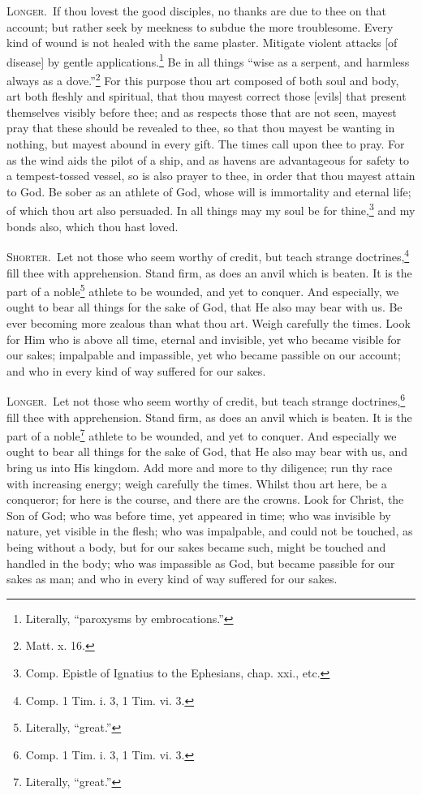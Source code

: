 \textsc{Longer.}~If thou lovest the good disciples, no thanks are due to thee on that account; but rather seek by meekness to subdue the more troublesome. Every kind of wound is not healed with the same plaster. Mitigate violent attacks [of disease] by gentle applications.\footnote{Literally, “paroxysms by embrocations.”} Be in all things “wise as a serpent, and harmless always as a dove.”\footnote{Matt. x. 16.} For this purpose thou art composed of both soul and body, art both fleshly and spiritual, that thou mayest correct those [evils] that present themselves visibly before thee; and as respects those that are not seen, mayest pray that these should be revealed to thee, so that thou mayest be wanting in nothing, but mayest abound in every gift. The times call upon thee to pray. For as the wind aids the pilot of a ship, and as havens are advantageous for safety to a tempest-tossed vessel, so is also prayer to thee, in order that thou mayest attain to God. Be sober as an athlete of God, whose will is immortality and eternal life; of which thou art also persuaded. In all things may my soul be for thine,\footnote{Comp. Epistle of Ignatius to the Ephesians, chap. xxi., etc.} and my bonds also, which thou hast loved.


\textsc{Shorter.}~Let not those who seem worthy of credit, but teach strange doctrines,\footnote{Comp. 1 Tim. i. 3, 1 Tim. vi. 3.} fill thee with apprehension. Stand firm, as does an anvil which is beaten. It is the part of a noble\footnote{Literally, “great.”} athlete to be wounded, and yet to conquer. And especially, we ought to bear all things for the sake of God, that He also may bear with us. Be ever becoming more zealous than what thou art. Weigh carefully the times. Look for Him who is above all time, eternal and invisible, yet who became visible for our sakes; impalpable and impassible, yet who became passible on our account; and who in every kind of way suffered for our sakes.

\textsc{Longer.}~Let not those who seem worthy of credit, but teach strange doctrines,\footnote{Comp. 1 Tim. i. 3, 1 Tim. vi. 3.} fill thee with apprehension. Stand firm, as does an anvil which is beaten. It is the part of a noble\footnote{Literally, “great.”} athlete to be wounded, and yet to conquer. And especially we ought to bear all things for the sake of God, that He also may bear with us, and bring us into His kingdom. Add more and more to thy diligence; run thy race with increasing energy; weigh carefully the times. Whilst thou art here, be a conqueror; for here is the course, and there are the crowns. Look for Christ, the Son of God; who was before time, yet appeared in time; who was invisible by nature, yet visible in the flesh; who was impalpable, and could not be touched, as being without a body, but for our sakes became such, might be touched and handled in the body; who was impassible as God, but became passible for our sakes as man; and who in every kind of way suffered for our sakes.

